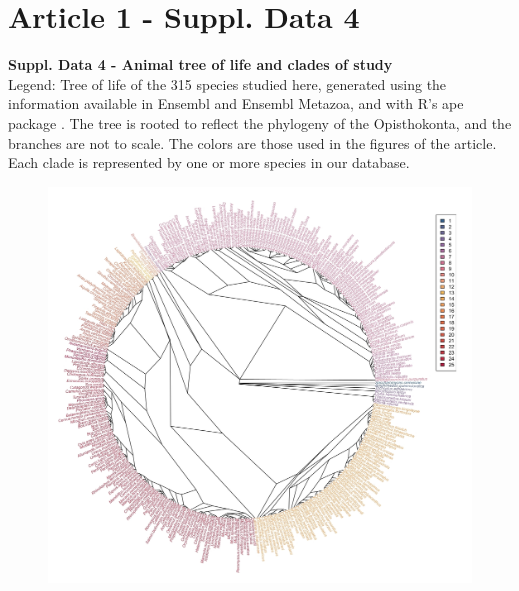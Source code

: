 \section{Article 1 - Suppl. Data 4}
\textbf{Suppl. Data 4 - Animal tree of life and clades of study} \\
Legend: Tree of life of the 315 species studied here, generated using the information available in Ensembl and Ensembl Metazoa, and with R's ape package \parencite{paradis_ape_2019}. The tree is rooted to reflect the phylogeny of the Opisthokonta, and the branches are not to scale. The colors are those used in the figures of the article. Each clade is represented by one or more species in our database.

\begin{figure}[H]
    \centering
    \includegraphics[width=1\textwidth]{figures/suppldata/suppldata4.jpg}
    \label{fig:suppldata4_tree}
\end{figure}

